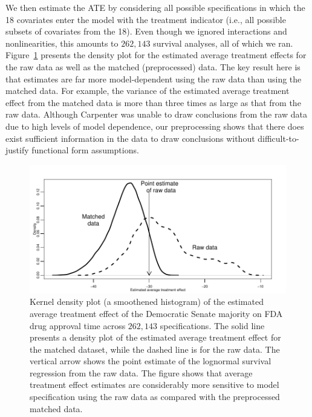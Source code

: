 \documentclass[11pt,titlepage]{article}
\begin{document}
We then estimate the ATE by considering all possible specifications in
which the 18 covariates enter the model with the treatment indicator
(i.e., all possible subsets of covariates from the 18).  Even though
we ignored interactions and nonlinearities, this amounts to $262,143$
survival analyses, all of which we ran. Figure~\ref{fg:fdadens}
presents the density plot for the estimated average treatment effects
for the raw data as well as the matched (preprocessed) data.  The key
result here is that estimates are far more model-dependent using the
raw data than using the matched data.  For example, the variance of
the estimated average treatment effect from the matched data is more
than three times as large as that from the raw data.  Although
Carpenter was unable to draw conclusions from the raw data due to
high levels of model dependence, our preprocessing shows that there
does exist sufficient information in the data to draw conclusions
without difficult-to-justify functional form assumptions.
\begin{figure}[t] 
 \begin{center}
   \includegraphics{figs/fdadens.pdf}
  \end{center}
  \vspace{-0.275in}
  \caption{Kernel density plot (a smoothened histogram)
    of the estimated average treatment effect of the Democratic Senate
    majority on FDA drug approval time across $262,143$
    specifications. The solid line presents a density plot of the
    estimated average treatment effect for the matched dataset, while
    the dashed line is for the raw data.  The vertical arrow shows the
    point estimate of the lognormal survival regression from the raw
    data.  The figure shows that average treatment effect estimates
    are considerably more sensitive to model specification using the
    raw data as compared with the preprocessed matched data.}
  \label{fg:fdadens}
\end{figure}
\end{document}
